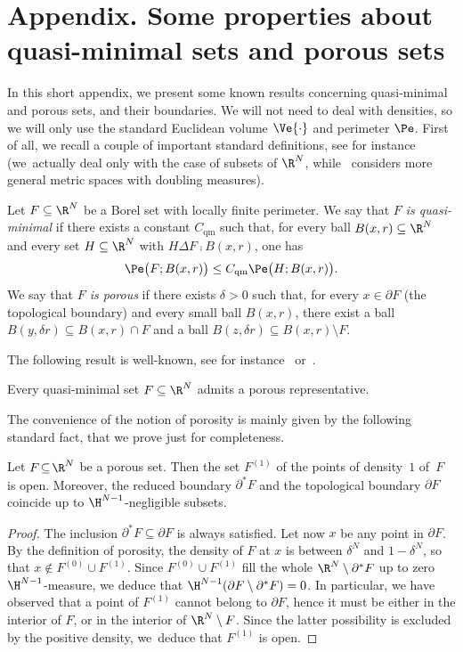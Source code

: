 \appendix
{}
\section*{Appendix. Some properties about quasi-minimal sets and porous sets}

In this short appendix, we present some known results concerning quasi-minimal and porous sets, and their boundaries. We will not need to deal with densities, so we will only use the standard Euclidean volume $\Ve{\cdot}$ and perimeter $\Pe$. First of all, we recall a couple of important standard definitions, see for instance~\cite{Tam,DavSem,KKLS} (we~actually deal only with the case of subsets of $\R^N$, while~\cite{KKLS} considers more general metric spaces with doubling measures).

\begin{defn}
Let $F\subseteq\R^N$ be a Borel set with locally finite perimeter. We say that \emph{$F$ is quasi-minimal} if there exists a constant $C_\mathrm{qm}$ such that, for every ball $B(x,r)\subseteq\R^N$ and every set $H\subseteq\R^N$ with $H\Delta F\comp B(x,r)$, one has
\[
\Pe\big(F;B(x,r)\big) \leq C_\mathrm{qm} \Pe\big(H;B(x,r)\big).
\]
We say that \emph{$F$ is porous} if there exists $\delta>0$ such that, for every $x\in \partial F$ (the topological boundary) and every small ball $B(x,r)$, there exist a ball $B(y,\delta r)\subseteq B(x,r)\cap F$ and a ball $B(z,\delta r)\subseteq B(x,r)\setminus F$.
\end{defn}

The following result is well-known, see for instance~\cite[Th.\,1.8]{DavSem} or~\cite[Th.\,5.2]{KKLS}.
\begin{thm}\label{qmpor}
Every quasi-minimal set $F\subseteq\R^N$ admits a porous representative.
\end{thm}

The convenience of the notion of porosity is mainly given by the following standard fact, that we prove just for completeness.

\begin{lem}\label{porope}
Let $F\!\subseteq\!\R^N$ be a porous set. Then the set $F^{(1)}$ of the points of density~$1$ of~$F$ is open. Moreover, the reduced boundary $\partial^* F$ and the topological boundary $\partial F$ coincide up to $\H^{N-1}$-negligible subsets.
\end{lem}
\begin{proof}
The inclusion $\partial^* F \subseteq \partial F$ is always satisfied. Let now $x$ be any point in $\partial F$. By the definition of porosity, the density of $F$ at $x$ is between $\delta^N$ and $1-\delta^N$, so that $x\notin F^{(0)}\cup F^{(1)}$. Since $F^{(0)}\cup F^{(1)}$ fill the whole $\R^N\setminus\partial^* F$ up to zero $\H^{N-1}$-measure, we deduce that $\H^{N-1}(\partial F\setminus \partial^* F)=0$. In particular, we have observed that a point of $F^{(1)}$ cannot belong to $\partial F$, hence it must be either in the interior of $F$, or in the interior of $\R^N\setminus F$. Since the latter possibility is excluded by the positive density, we~deduce that $F^{(1)}$ is open.
\end{proof}

